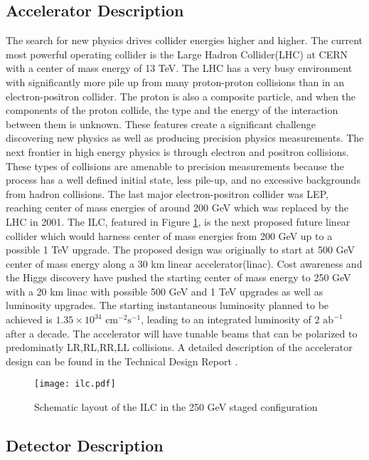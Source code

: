 \subsection{Accelerator Description}
\label{ilc}


The search for new physics drives collider energies higher and higher. The current most powerful operating collider is the Large Hadron Collider(LHC) at CERN with a center of mass energy of 13 TeV. The LHC has a very busy environment with significantly more pile up from many proton-proton collisions than in an electron-positron collider. The proton is also a composite particle, and when the components of the proton collide, the type and the energy of the interaction between them is unknown. These features create a significant challenge discovering new physics as well as producing precision physics measurements. The next frontier in high energy physics is through electron and positron collisions. These types of collisions are amenable to precision measurements because the process has a well defined initial state, less pile-up, and no excessive backgrounds from hadron collisions. The last major electron-positron collider was LEP, reaching center of mass energies of around 200 GeV which was replaced by the LHC in 2001.  The ILC, featured in Figure \ref{fig:ilc}, is the next proposed future linear collider which would harness center of mass energies from 200 GeV up to a possible 1 TeV upgrade.  The proposed design was originally to start at 500 GeV center of mass energy along a 30 km linear accelerator(linac). Cost awareness and the Higgs discovery have pushed the starting center of mass energy to 250 GeV  with a 20 km linac with possible 500 GeV and 1 TeV upgrades as well as luminosity upgrades.  The starting instantaneous luminosity planned to be achieved is $1.35 \times 10^{34} \, \, \text{cm}^{-2}\text{s}^{-1}$, leading to an integrated luminosity of $2 \, \, \text{ab}^{-1}$ after a decade. The accelerator will have tunable beams that can be polarized to predominatly LR,RL,RR,LL collisions.\cite{currdetector} A detailed description of the accelerator design can be found in the Technical Design Report \cite{tdraccel}.

\begin{figure}

\texttt{[image: ilc.pdf]}
\caption{Schematic layout of the ILC in the 250 GeV staged configuration \cite{currdetector} }
\label{fig:ilc}
\end{figure}

\subsection{Detector Description}
\label{ild}


